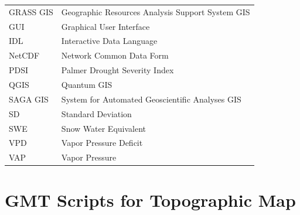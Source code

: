 \documentclass[geosciences,article,accept,pdftex,oneauthor]{Definitions/mdpi}
\begin{document}
{\noindent 
\begin{tabular}{@{}ll}
GRASS GIS & Geographic Resources Analysis Support System GIS \\
GUI & Graphical User Interface \\
IDL & Interactive Data Language \\
NetCDF & Network Common Data Form \\
PDSI & Palmer Drought Severity Index \\
QGIS & Quantum GIS \\
SAGA GIS & System for Automated Geoscientific Analyses GIS \\
SD & Standard Deviation \\
SWE & Snow Water Equivalent \\
VPD & Vapor Pressure Deficit \\
VAP & Vapor Pressure \\
\end{tabular}

}

{} %
\appendixstart
\appendix
\section[\appendixname~\thesection]{GMT Scripts for Topographic Map}
\end{document}
